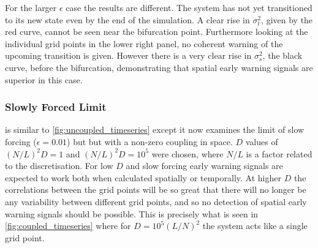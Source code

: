 For the larger $\epsilon$ case the results are different. The system has not yet transitioned to
its new state even by the end of the simulation. A clear rise in $\sigma_t^2$, given by the red curve, cannot be seen near the bifurcation point. Furthermore looking at the individual grid points
in the lower right panel, no coherent warning of the upcoming transition is given.
However there is a very clear rise in $\sigma_s^2$, the black curve, before the bifurcation, demonstrating that spatial early warning signals are superior in this case.

\subsubsection{Slowly Forced Limit}
 is similar to \cref{fig:uncoupled_timeseries} except it now examines the limit of slow forcing ($\epsilon = 0.01$) but
but with a non-zero coupling in space. $D$ values of $(N/L)^2D = 1$ and $(N/L)^2 D = 10^5$ were chosen, where $N/L$ is a factor related to the discretisation.
For low $D$ and slow forcing early warning signals are expected to work both when calculated spatially or
temporally. At higher $D$ the correlations between the grid points will be so great that there will no longer be any variability between different grid points, and so no detection
of spatial early warning signals should be possible. This is precisely what is seen in \cref{fig:coupled_timeseries} where for $D=10^5 (L/N)^2$ the system acts like a single grid point.
